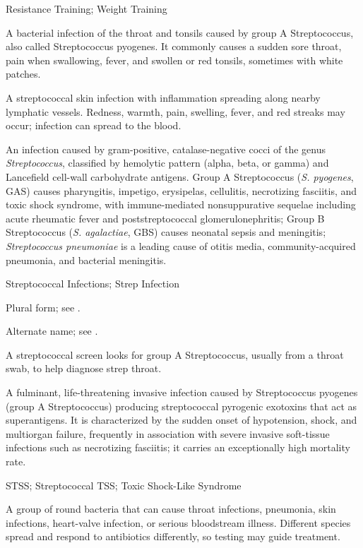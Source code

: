 \synonyms
Resistance Training; Weight Training

 A bacterial infection of the throat and tonsils caused by group A Streptococcus, also called Streptococcus pyogenes. It commonly causes a sudden sore throat, pain when swallowing, fever, and swollen or red tonsils, sometimes with white patches.

 A streptococcal skin infection with inflammation spreading along nearby lymphatic vessels. Redness, warmth, pain, swelling, fever, and red streaks may occur; infection can spread to the blood.

 An infection caused by gram-positive, catalase-negative cocci of the genus \textit{Streptococcus}, classified by hemolytic pattern (alpha, beta, or gamma) and Lancefield cell-wall carbohydrate antigens. Group A Streptococcus (\textit{S. pyogenes}, GAS) causes pharyngitis, impetigo, erysipelas, cellulitis, necrotizing fasciitis, and toxic shock syndrome, with immune-mediated nonsuppurative sequelae including acute rheumatic fever and poststreptococcal glomerulonephritis; Group B Streptococcus (\textit{S. agalactiae}, GBS) causes neonatal sepsis and meningitis; \textit{Streptococcus pneumoniae} is a leading cause of otitis media, community-acquired pneumonia, and bacterial meningitis.

\synonyms
Streptococcal Infections; Strep Infection

 Plural form; see .

 Alternate name; see .

 A streptococcal screen looks for group A Streptococcus, usually from a throat swab, to help diagnose strep throat.

 A fulminant, life-threatening invasive infection caused by Streptococcus pyogenes (group A Streptococcus) producing streptococcal pyrogenic exotoxins that act as superantigens. It is characterized by the sudden onset of hypotension, shock, and multiorgan failure, frequently in association with severe invasive soft-tissue infections such as necrotizing fasciitis; it carries an exceptionally high mortality rate.

\synonyms
STSS; Streptococcal TSS; Toxic Shock-Like Syndrome

 A group of round bacteria that can cause throat infections, pneumonia, skin infections, heart-valve infection, or serious bloodstream illness. Different species spread and respond to antibiotics differently, so testing may guide treatment.


